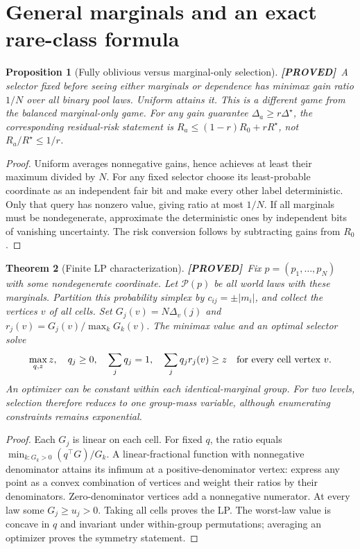 \documentclass[11pt]{article}
\newtheorem{theorem}{Theorem}[section]
\newtheorem{proposition}[theorem]{Proposition}
\theoremstyle{definition}
\newcommand{\1}{\mathbf 1}
\newcommand{\pr}{\textbf{[PROVED]}}
\begin{document}
\section{General marginals and an exact rare-class formula}
\begin{proposition}[Fully oblivious versus marginal-only selection]
\label{prop:oblivious}
\pr\ A selector fixed before seeing either marginals or dependence has
minimax gain ratio $1/N$ over all binary pool laws. Uniform attains it.
This is a different game from the balanced marginal-only game.
For any gain guarantee $\Delta_a\ge r\Delta^\star$, the corresponding
residual-risk statement is
$R_a\le(1-r)R_0+rR^\star$, not $R_a/R^\star\le1/r$.
\end{proposition}
\begin{proof}
Uniform averages nonnegative gains, hence achieves at least their maximum
divided by $N$. For any fixed selector choose its least-probable coordinate
as an independent fair bit and make every other label deterministic.
Only that query has nonzero value, giving ratio at most $1/N$.
If all marginals must be nondegenerate, approximate the deterministic ones
by independent bits of vanishing uncertainty. The risk conversion follows
by subtracting gains from $R_0$.
\end{proof}
\begin{theorem}[Finite LP characterization]\label{th:LP}
\pr\ Fix $p=(p_1,\ldots,p_N)$ with some nondegenerate coordinate. Let
$\mathcal P(p)$ be all world laws with these marginals. Partition this
probability simplex by $c_{ij}=\pm|m_i|$, and collect the vertices $v$ of
all cells. Set $G_j(v)=N\Delta_v(j)$ and
$r_j(v)=G_j(v)/\max_kG_k(v)$. The minimax value and an optimal selector solve
\[
 \max_{q,z}z,\quad q_j\ge0,\quad\sum_jq_j=1,\quad
 \sum_jq_jr_j(v)\ge z\quad\hbox{for every cell vertex }v.
\]
An optimizer can be constant within each identical-marginal group.
For two levels, selection therefore reduces to one group-mass variable,
although enumerating constraints remains exponential.
\end{theorem}
\begin{proof}
Each $G_j$ is linear on each cell. For fixed $q$, the ratio equals
$\min_{k:G_k>0}(q^\top G)/G_k$. A linear-fractional function with nonnegative
denominator attains its infimum at a positive-denominator vertex: express
any point as a convex combination of vertices and weight their ratios by
their denominators. Zero-denominator vertices add a nonnegative numerator.
At every law some $G_j\ge u_j>0$. Taking all cells proves the LP.
The worst-law value is concave in $q$ and invariant under within-group
permutations; averaging an optimizer proves the symmetry statement.
\end{proof}
\end{document}
